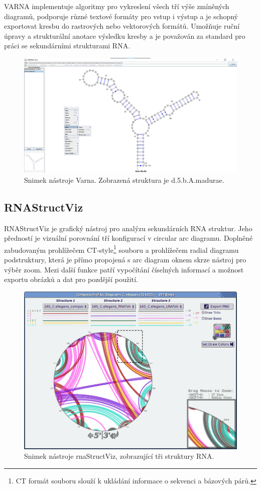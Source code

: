 VARNA implementuje algoritmy pro vykreslení všech tří výše zmíněných diagramů,
podporuje různé textové formáty pro vstup i výstup a je schopný exportovat
kresbu do rastrových nebo vektorových formátů. Umožňuje ruční úpravy a
strukturální anotace výsledku kresby a je považován za standard pro práci se
sekundárními strukturami RNA.

\begin{figure}[H]
  \centering
  \includegraphics[width=140mm]{../img/kap01/varna.png}
  \caption{Snimek nástroje Varna. Zobrazená struktura je d.5.b.A.madurae.}
\end{figure}

\subsection{RNAStructViz} 

RNAStructViz\cite{RnaStructViz} je grafický nástroj pro analýzu sekundárních
RNA struktur. Jeho předností je vizuální porovnání tří konfigurací v circular
arc diagramu. Doplněné zabudovaným prohlížečem CT-style\footnote{CT formát
souboru slouží k ukládání informace o sekvenci a bázových párů.} souboru a
prohlížečem radial diagramu podstruktury, která je přímo propojená s arc
diagram oknem skrze nástroj pro výběr zoom. Mezi další funkce patří vypočítání
číselných informací a možnost exportu obrázků a dat pro pozdější použití.

\begin{figure}[H]
  \centering
  \includegraphics[width=140mm]{../img/kap01/rnaStructViz.png}
  \caption{Snimek nástroje rnaStructViz, zobrazující tři struktury RNA.}
\end{figure}

